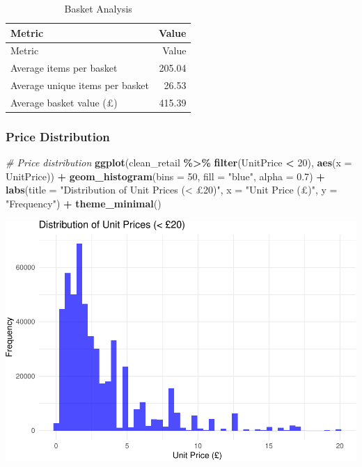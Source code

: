 \documentclass[
]{article}
\newenvironment{Shaded}{\begin{snugshade}}{\end{snugshade}}
\newcommand{\AttributeTok}[1]{\textcolor[rgb]{0.13,0.29,0.53}{#1}}
\newcommand{\CommentTok}[1]{\textcolor[rgb]{0.56,0.35,0.01}{\textit{#1}}}
\newcommand{\DecValTok}[1]{\textcolor[rgb]{0.00,0.00,0.81}{#1}}
\newcommand{\FloatTok}[1]{\textcolor[rgb]{0.00,0.00,0.81}{#1}}
\newcommand{\FunctionTok}[1]{\textcolor[rgb]{0.13,0.29,0.53}{\textbf{#1}}}
\newcommand{\NormalTok}[1]{#1}
\newcommand{\SpecialCharTok}[1]{\textcolor[rgb]{0.81,0.36,0.00}{\textbf{#1}}}
\newcommand{\StringTok}[1]{\textcolor[rgb]{0.31,0.60,0.02}{#1}}
\begin{document}
\begin{longtable}[]{@{}lr@{}}
\caption{Basket Analysis}\tabularnewline
\toprule\noalign{}
Metric & Value \\
\midrule\noalign{}
\endfirsthead
\toprule\noalign{}
Metric & Value \\
\midrule\noalign{}
\endhead
\bottomrule\noalign{}
\endlastfoot
Average items per basket & 205.04 \\
Average unique items per basket & 26.53 \\
Average basket value (£) & 415.39 \\
\end{longtable}

\subsubsection{Price Distribution}\label{price-distribution}

\begin{Shaded}
\begin{Highlighting}[]
\CommentTok{\# Price distribution}
\FunctionTok{ggplot}\NormalTok{(clean\_retail }\SpecialCharTok{\%\textgreater{}\%} \FunctionTok{filter}\NormalTok{(UnitPrice }\SpecialCharTok{\textless{}} \DecValTok{20}\NormalTok{), }\FunctionTok{aes}\NormalTok{(}\AttributeTok{x =}\NormalTok{ UnitPrice)) }\SpecialCharTok{+}
  \FunctionTok{geom\_histogram}\NormalTok{(}\AttributeTok{bins =} \DecValTok{50}\NormalTok{, }\AttributeTok{fill =} \StringTok{"blue"}\NormalTok{, }\AttributeTok{alpha =} \FloatTok{0.7}\NormalTok{) }\SpecialCharTok{+}
  \FunctionTok{labs}\NormalTok{(}\AttributeTok{title =} \StringTok{"Distribution of Unit Prices (\textless{} £20)"}\NormalTok{, }
       \AttributeTok{x =} \StringTok{"Unit Price (£)"}\NormalTok{, }\AttributeTok{y =} \StringTok{"Frequency"}\NormalTok{) }\SpecialCharTok{+}
  \FunctionTok{theme\_minimal}\NormalTok{()}
\end{Highlighting}
\end{Shaded}

\includegraphics{capstone_customer_segmentation_files/figure-latex/exploratory-data-analysis11-1.pdf}
\end{document}
